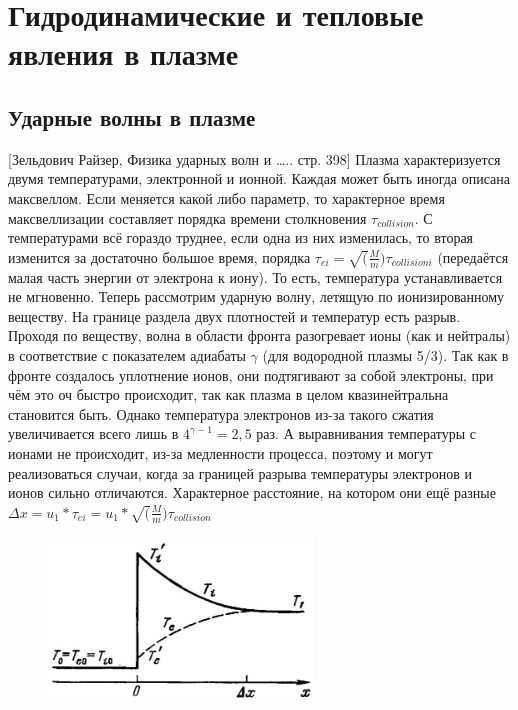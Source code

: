 \documentclass[10pt, a4paper]{article}
\let\stdsection\section
\renewcommand\section{\newpage\stdsection}
\begin{document}
\section{ Гидродинамические и тепловые явления в плазме}

\subsection{Ударные волны в плазме}

[Зельдович Райзер, Физика ударных волн и ….. стр. 398]
Плазма характеризуется двумя температурами, электронной и ионной. Каждая может быть иногда описана максвеллом. Если меняется какой либо параметр, то характерное время максвеллизации составляет порядка времени столкновения $\tau_{collision}$. С температурами всё гораздо труднее, если одна из них изменилась, то вторая изменится за достаточно большое время, порядка $\tau_{ei}=\sqrt(\frac{M}{m}) \tau_{collision i}$ (передаётся малая часть энергии от электрона к иону). То есть, температура устанавливается не мгновенно.
Теперь рассмотрим ударную волну, летящую по ионизированному веществу.
На границе раздела двух плотностей и температур есть разрыв. Проходя по веществу, волна в области фронта разогревает ионы (как и нейтралы) в соответствие с показателем адиабаты $\gamma$ (для водородной плазмы 5/3). Так как в фронте создалось уплотнение ионов, они подтягивают за собой электроны, при чём это оч быстро происходит, так как плазма в целом квазинейтральна становится быть. Однако температура электронов из-за такого сжатия увеличивается всего лишь в $4^{\gamma - 1}=2,5$ раз. А выравнивания температуры с ионами не происходит, из-за медленности процесса, поэтому и могут реализоваться случаи, когда за границей разрыва температуры электронов и ионов сильно отличаются. Характерное расстояние, на котором они ещё разные $\Delta x = u_1*\tau_{ei} =u_1* \sqrt(\frac{M}{m}) \tau_{collision}$

\begin{figure}[h!]
	\begin{center}
		\includegraphics[width=70mm]{13. Skach plotn.JPG}
	\end{center}
\end{figure}
\end{document}
